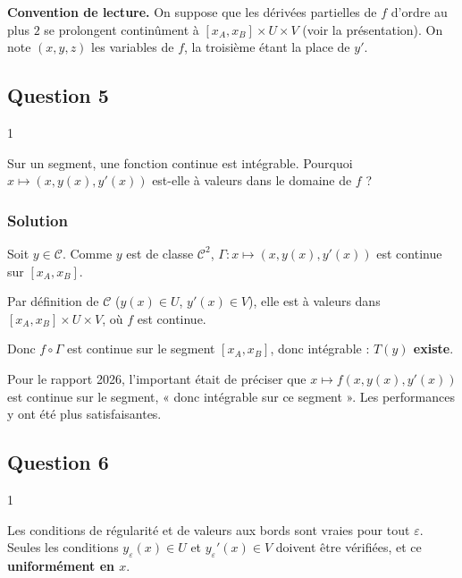 \documentclass[11pt,a4paper]{article}
\begin{document}
\textbf{Convention de lecture.} On suppose que les dérivées partielles de \(f\) d'ordre au plus \(2\) se prolongent continûment à \([x_A,x_B]\times U\times V\) (voir la présentation). On note \((x,y,z)\) les variables de \(f\), la troisième étant la place de \(y'\).

\hypertarget{question-5}{%
\subsection{Question 5}\label{question-5}}

\begin{indication}{1}

Sur un segment, une fonction continue est intégrable. Pourquoi \(x\mapsto(x,y(x),y'(x))\) est-elle à valeurs dans le domaine de \(f\) ?

\end{indication}

\hypertarget{solution-4}{%
\subsubsection{Solution}\label{solution-4}}

Soit \(y\in\mathcal C\). Comme \(y\) est de classe \(\mathcal C^2\), \(\Gamma:x\mapsto(x,y(x),y'(x))\) est continue sur \([x_A,x_B]\).

Par définition de \(\mathcal C\) (\(y(x)\in U\), \(y'(x)\in V\)), elle est à valeurs dans \([x_A,x_B]\times U\times V\), où \(f\) est continue.

Donc \(f\circ\Gamma\) est continue sur le segment \([x_A,x_B]\), donc intégrable : \textbf{\(T(y)\) existe}.

\begin{jury}

Pour le rapport 2026, l'important était de préciser que \(x\mapsto f(x,y(x),y'(x))\) est continue sur le segment, « donc intégrable sur ce segment ». Les performances y ont été plus satisfaisantes.

\end{jury}

\hypertarget{question-6}{%
\subsection{Question 6}\label{question-6}}

\begin{indication}{1}

Les conditions de régularité et de valeurs aux bords sont vraies pour tout \(\varepsilon\). Seules les conditions \(y_\varepsilon(x)\in U\) et \(y_\varepsilon'(x)\in V\) doivent être vérifiées, et ce \textbf{uniformément en \(x\)}.

\end{indication}
\end{document}
